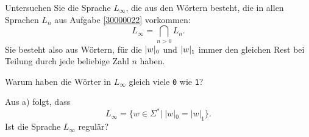 Untersuchen Sie die Sprache $L_\infty$, die aus den Wörtern besteht, die
in allen Sprachen $L_n$ aus Aufgabe \ref{30000022} vorkommen:
\[
L_{\infty} = \bigcap_{n>0}L_n.
\]
Sie besteht also aus Wörtern, für die
$|w|_{\tt 0}$ und
$|w|_{\tt 1}$ immer den gleichen Rest bei Teilung durch jede beliebige
Zahl $n$ haben.

\begin{teilaufgaben}
\item Warum haben die Wörter in $L_\infty$ gleich viele {\tt 0}
wie {\tt 1}?
\item Aus a) folgt, dass
$$L_\infty = \{w\in\Sigma^*|\;|w|_0=|w|_1\}.$$
Ist die Sprache $L_\infty$ regulär?
\end{teilaufgaben}


